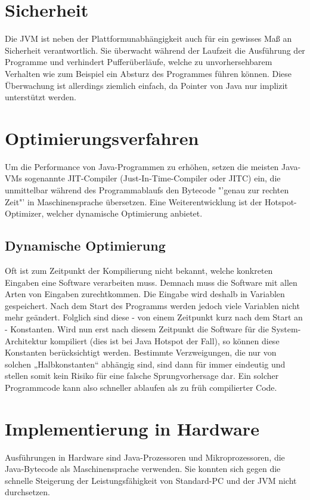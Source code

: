 \documentclass[a4paper,14pt]{scrreprt}
\begin{document}
\section{Sicherheit}
Die JVM ist neben der Plattformunabhängigkeit auch für ein gewisses Maß an Sicherheit verantwortlich. Sie überwacht während der Laufzeit die Ausführung der Programme und verhindert Pufferüberläufe, welche zu unvorhersehbarem Verhalten wie zum Beispiel ein Absturz des Programmes führen können. Diese Überwachung ist allerdings ziemlich einfach, da Pointer von Java nur implizit unterstützt werden.
\section{Optimierungsverfahren}
Um die Performance von Java-Programmen zu erhöhen, setzen die meisten Java-VMs sogenannte JIT-Compiler (Just-In-Time-Compiler oder JITC) ein, die unmittelbar während des Programmablaufs den Bytecode "'genau zur rechten Zeit"' in Maschinensprache übersetzen. Eine Weiterentwicklung ist der Hotspot-Optimizer, welcher dynamische Optimierung anbietet.
\subsection{Dynamische Optimierung}
Oft ist zum Zeitpunkt der Kompilierung nicht bekannt, welche konkreten Eingaben eine Software verarbeiten muss. Demnach muss die Software mit allen Arten von Eingaben zurechtkommen. Die Eingabe wird deshalb in Variablen gespeichert. Nach dem Start des Programms werden jedoch viele Variablen nicht mehr geändert. Folglich sind diese - von einem Zeitpunkt kurz nach dem Start an - Konstanten. Wird nun erst nach diesem Zeitpunkt die Software für die System-Architektur kompiliert (dies ist bei Java Hotspot der Fall), so können diese Konstanten berücksichtigt werden. Bestimmte Verzweigungen, die nur von solchen „Halbkonstanten“ abhängig sind, sind dann für immer eindeutig und stellen somit kein Risiko für eine falsche Sprungvorhersage dar. Ein solcher Programmcode kann also schneller ablaufen als zu früh compilierter Code.
\section{Implementierung in Hardware}
Ausführungen in Hardware sind Java-Prozessoren und Mikroprozessoren, die Java-Bytecode als Maschinensprache verwenden. Sie konnten sich gegen die schnelle Steigerung der Leistungsfähigkeit von Standard-PC und der JVM nicht durchsetzen.
\end{document}

